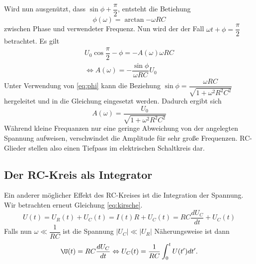     Wird nun ausgenützt, dass $\sin{\phi + \dfrac{\pi}{2}}$, entsteht die Betiehung
    \begin{equation}
        \label{eq:phi}
        \phi(\omega)=\arctan{-\omega RC}
    \end{equation}
    zwischen Phase und verwendeter Frequenz. Nun wird der der Fall $\omega t + \phi = 
    \dfrac{\pi}{2}$ betrachtet. Es gilt
    \begin{align*}
        U_0 \cos{\dfrac{\pi}{2}-\phi}=-A(\omega)\omega RC\\
        \Leftrightarrow A(\omega)=-\dfrac{\sin{\phi}}{\omega RC}U_0
    \end{align*}
    Unter Verwendung von \ref{eq:phi} kann die Beziehung $\sin{\phi}=\dfrac{\omega RC}
    {\sqrt{1+\omega^2 R^2 C^2}}$ hergeleitet und in die Gleichung eingesetzt werden.
    Dadurch ergibt sich 
    \begin{equation}
        A(\omega)=\dfrac{U_0}{\sqrt{1+\omega^2 R^2 C^2}}
    \end{equation}
    Während kleine Frequanzen nur eine geringe Abweichung von der angelegten Spannung
    aufweisen, verschwindet die Amplitude für sehr große Frequenzen.
    RC-Glieder stellen also einen Tiefpass im elektrischen Schaltkreis dar.

\subsection{Der RC-Kreis als Integrator}
    Ein anderer möglicher Effekt des RC-Kreises ist die Integration der Spannung. Wir betrachten 
    erneut Gleichung \ref{eq:kirsche}.
    \begin{equation*}
        U(t)=U_R(t)+U_C(t)=I(t)R+U_C(t)=RC\dfrac{dU_C}{dt}+U_C(t)
    \end{equation*} 
    Falls nun $\omega \ll \dfrac{1}{RC}$ ist die Spannung $\vert U_C \vert \ll \vert U_R \vert$
    Näherungsweise ist dann 
    \begin{equation}
        \U(t)=RC\dfrac{dU_C}{dt} \Leftrightarrow U_C(t)=\dfrac{1}{RC}\int_0^t U(t')dt'.
    \end{equation}
